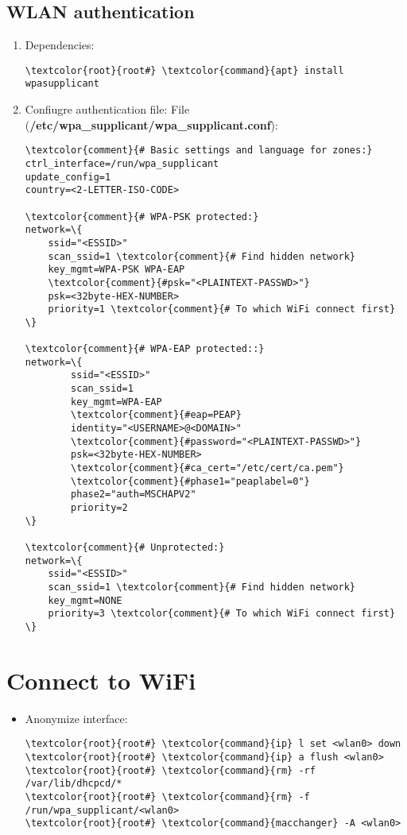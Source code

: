 \documentclass[10pt, a4paper, onecolumn, openany]{book} %
\begin{document}
\subsection{WLAN authentication}
\begin{enumerate}
    \item Dependencies:
\begin{Verbatim}[commandchars=\\\{\}]
\textcolor{root}{root#} \textcolor{command}{apt} install wpasupplicant
\end{Verbatim}
    \item Confiugre authentication file:
\newline File (\textbf{\textcolor{file}{/etc/wpa\_supplicant/wpa\_supplicant.conf}}):
\begin{Verbatim}[commandchars=\\\{\}]
\textcolor{comment}{# Basic settings and language for zones:}
ctrl_interface=/run/wpa_supplicant
update_config=1
country=<2-LETTER-ISO-CODE>

\textcolor{comment}{# WPA-PSK protected:}
network=\{
    ssid="<ESSID>"
    scan_ssid=1 \textcolor{comment}{# Find hidden network}
    key_mgmt=WPA-PSK WPA-EAP
    \textcolor{comment}{#psk="<PLAINTEXT-PASSWD>"}
    psk=<32byte-HEX-NUMBER>
    priority=1 \textcolor{comment}{# To which WiFi connect first}
\}

\textcolor{comment}{# WPA-EAP protected::}
network=\{
        ssid="<ESSID>"
        scan_ssid=1
        key_mgmt=WPA-EAP
        \textcolor{comment}{#eap=PEAP}
        identity="<USERNAME>@<DOMAIN>"
        \textcolor{comment}{#password="<PLAINTEXT-PASSWD>"}
        psk=<32byte-HEX-NUMBER>
        \textcolor{comment}{#ca_cert="/etc/cert/ca.pem"}
        \textcolor{comment}{#phase1="peaplabel=0"}
        phase2="auth=MSCHAPV2"
        priority=2
\}

\textcolor{comment}{# Unprotected:}
network=\{
    ssid="<ESSID>"
    scan_ssid=1 \textcolor{comment}{# Find hidden network}
    key_mgmt=NONE
    priority=3 \textcolor{comment}{# To which WiFi connect first}
\}
\end{Verbatim}
\end{enumerate}
\section{Connect to WiFi}
\begin{itemize}
    \item Anonymize interface:
\begin{Verbatim}[commandchars=\\\{\}]
\textcolor{root}{root#} \textcolor{command}{ip} l set <wlan0> down
\textcolor{root}{root#} \textcolor{command}{ip} a flush <wlan0>
\textcolor{root}{root#} \textcolor{command}{rm} -rf /var/lib/dhcpcd/*
\textcolor{root}{root#} \textcolor{command}{rm} -f /run/wpa_supplicant/<wlan0>
\textcolor{root}{root#} \textcolor{command}{macchanger} -A <wlan0>
\end{Verbatim}
\end{itemize}
\end{document}
